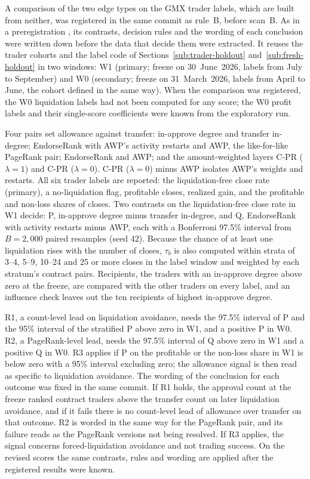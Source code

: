 A comparison of the two edge types on the GMX trader labels, which are built from neither, was registered in the same commit as rule~B, before scan~B. As in a preregistration \parencite{nosek2018preregistration}, its contrasts, decision rules and the wording of each conclusion were written down before the data that decide them were extracted. It reuses the trader cohorts and the label code of Sections~\ref{sub:trader-holdout} and~\ref{sub:fresh-holdout} in two windows: W1 (primary; freeze on 30~June~2026, labels from July to September) and W0 (secondary; freeze on 31~March~2026, labels from April to June, the cohort defined in the same way). When the comparison was registered, the W0 liquidation labels had not been computed for any score; the W0 profit labels and their single-score coefficients were known from the exploratory run.

Four pairs set allowance against transfer: in-approve degree and transfer in-degree; EndorseRank with AWP's activity restarts and AWP, the like-for-like PageRank pair; EndorseRank and AWP; and the amount-weighted layers C-PR ($\lambda=1$) and C-PR ($\lambda=0$). C-PR ($\lambda=0$) minus AWP isolates AWP's weights and restarts. All six trader labels are reported: the liquidation-free close rate (primary), a no-liquidation flag, profitable closes, realized gain, and the profitable and non-loss shares of closes. Two contrasts on the liquidation-free close rate in W1 decide: P, in-approve degree minus transfer in-degree, and Q, EndorseRank with activity restarts minus AWP, each with a Bonferroni 97.5\% interval from $B=2{,}000$ paired resamples (seed 42). Because the chance of at least one liquidation rises with the number of closes, $\tau_b$ is also computed within strata of 3--4, 5--9, 10--24 and 25 or more closes in the label window and weighted by each stratum's contract pairs. Recipients, the traders with an in-approve degree above zero at the freeze, are compared with the other traders on every label, and an influence check leaves out the ten recipients of highest in-approve degree.

R1, a count-level lead on liquidation avoidance, needs the 97.5\% interval of P and the 95\% interval of the stratified P above zero in W1, and a positive P in W0. R2, a PageRank-level lead, needs the 97.5\% interval of Q above zero in W1 and a positive Q in W0. R3 applies if P on the profitable or the non-loss share in W1 is below zero with a 95\% interval excluding zero; the allowance signal is then read as specific to liquidation avoidance. The wording of the conclusion for each outcome was fixed in the same commit. If R1 holds, the approval count at the freeze ranked contract traders above the transfer count on later liquidation avoidance, and if it fails there is no count-level lead of allowance over transfer on that outcome. R2 is worded in the same way for the PageRank pair, and its failure reads as the PageRank versions not being resolved. If R3 applies, the signal concerns forced-liquidation avoidance and not trading success. On the revised scores the same contrasts, rules and wording are applied after the registered results were known.


